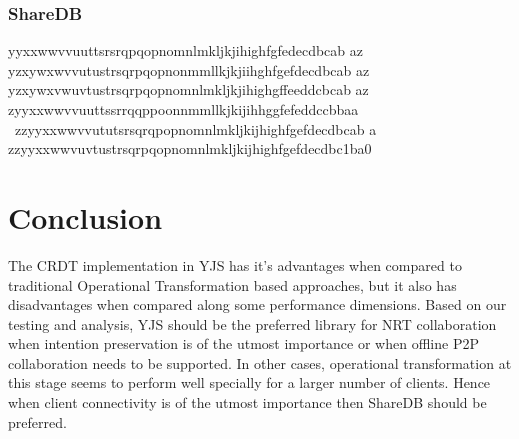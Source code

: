 \documentclass[12pt]{article}
\begin{document}
  \subsubsection{ShareDB}
  yyxxwwvvuuttsrsrqpqopnomnlmkljkjihighfgfedecdbcab az yzxywxwvvutustrsqrpqopnonmmllkjkjiihghfgefdecdbcab az yzxywxvwuvtustrsqrpqopnomnlmkljkjihighgffeeddcbcab az zyyxxwwvvuuttssrrqqppoonnmmllkjkijihhggfefeddccbbaa \ zzyyxxwwvvututsrsqrqpopnomnlmkljkijhighfgefdecdbcab a zzyyxxwwvuvtustrsqrpqopnomnlmkljkijhighfgefdecdbc1ba0

  \section{Conclusion}
  The CRDT implementation in YJS has it's advantages when compared to traditional Operational Transformation based approaches, but it also has disadvantages when compared along some performance dimensions.
  Based on our testing and analysis, YJS should be the preferred library for NRT collaboration when intention preservation is of the utmost importance or when offline P2P collaboration needs to be supported.
  In other cases, operational transformation at this stage seems to perform well specially for a larger number of clients. Hence when client connectivity is of the utmost importance then ShareDB should be preferred.
\end{document}
